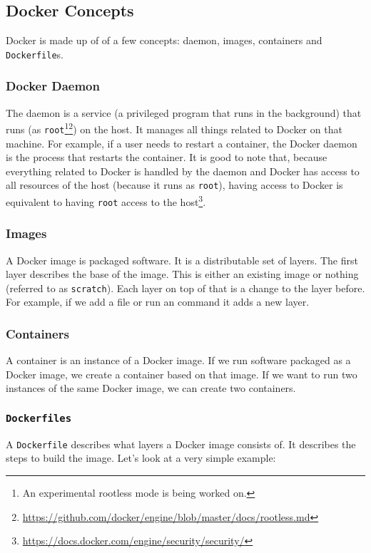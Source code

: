 \subsection{Docker Concepts}
Docker is made up of of a few concepts: daemon, images, containers and \lstinline{Dockerfile}s.

\subsubsection{Docker Daemon}
The daemon is a service (a privileged program that runs in the background) that runs (as \lstinline{root}\footnote{An experimental rootless mode is being worked on.}\footnote{\url{https://github.com/docker/engine/blob/master/docs/rootless.md}}) on the host. It manages all things related to Docker on that machine. For example, if a user needs to restart a container, the Docker daemon is the process that restarts the container. It is good to note that, because everything related to Docker is handled by the daemon and Docker has access to all resources of the host (because it runs as \lstinline{root}), having access to Docker is equivalent to having \lstinline{root} access to the host\footnote{\url{https://docs.docker.com/engine/security/security/}}.

\subsubsection{Images}
A Docker image is packaged software. It is a distributable set of layers. The first layer describes the base of the image. This is either an existing image or nothing (referred to as \lstinline{scratch}). Each layer on top of that is a change to the layer before. For example, if we add a file or run an command it adds a new layer.

\subsubsection{Containers}
A container is an instance of a Docker image. If we run software packaged as a Docker image, we create a container based on that image. If we want to run two instances of the same Docker image, we can create two containers.

\subsubsection{\texorpdfstring{\lstinline{Dockerfiles}}{Dockerfiles}}
A \lstinline{Dockerfile} describes what layers a Docker image consists of. It describes the steps to build the image. Let's look at a very simple example:

